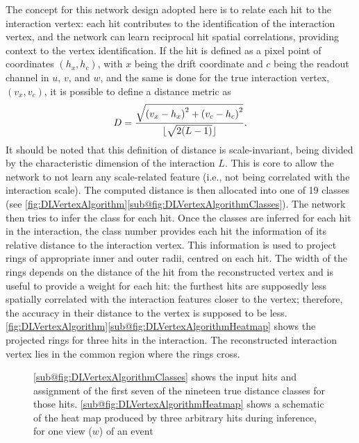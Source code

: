 The concept for this network design adopted here is to relate each hit to the interaction vertex: each hit contributes to the identification of the interaction vertex, and the network can learn reciprocal hit spatial correlations, providing context to the vertex identification. If the hit is defined as a pixel point of coordinates $(h_x, h_c)$, with $x$ being the drift coordinate and $c$ being the readout channel in $u$, $v$, and $w$, and the same is done for the true interaction vertex, $(v_x, v_c)$, it is possible to define a distance metric as \begin{equation}
    D = \frac{\sqrt{\qty(v_x - h_x)^2 + \qty(v_c - h_c)^2}}{\lfloor\sqrt{2\qty(L - 1)}\rfloor}.
\end{equation} It should be noted that this definition of distance is scale-invariant, being divided by the characteristic dimension of the interaction $L$. This is core to allow the network to not learn any scale-related feature (i.e., not being correlated with the interaction scale). The computed distance is then allocated into one of 19 classes (see \autoref{fig:DLVertexAlgorithm}\ref{sub@fig:DLVertexAlgorithmClasses}). The network then tries to infer the class for each hit. Once the classes are inferred for each hit in the interaction, the class number provides each hit the information of its relative distance to the interaction vertex. This information is used to project rings of appropriate inner and outer radii, centred on each hit. The width of the rings depends on the distance of the hit from the reconstructed vertex and is useful to provide a weight for each hit: the furthest hits are supposedly less spatially correlated with the interaction features closer to the vertex; therefore, the accuracy in their distance to the vertex is supposed to be less. \autoref{fig:DLVertexAlgorithm}\ref{sub@fig:DLVertexAlgorithmHeatmap} shows the projected rings for three hits in the interaction. The reconstructed interaction vertex lies in the common region where the rings cross. 

\begin{figure}
    \centering
    \caption[Working principle of the DL vertex algorithm]{\ref{sub@fig:DLVertexAlgorithmClasses} shows the input hits and assignment of the first seven of the nineteen true distance classes for those hits. \ref{sub@fig:DLVertexAlgorithmHeatmap} shows a schematic of the heat map produced by three arbitrary hits during inference, for one view ($w$) of an event}
    \label{fig:DLVertexAlgorithm}
\end{figure}

